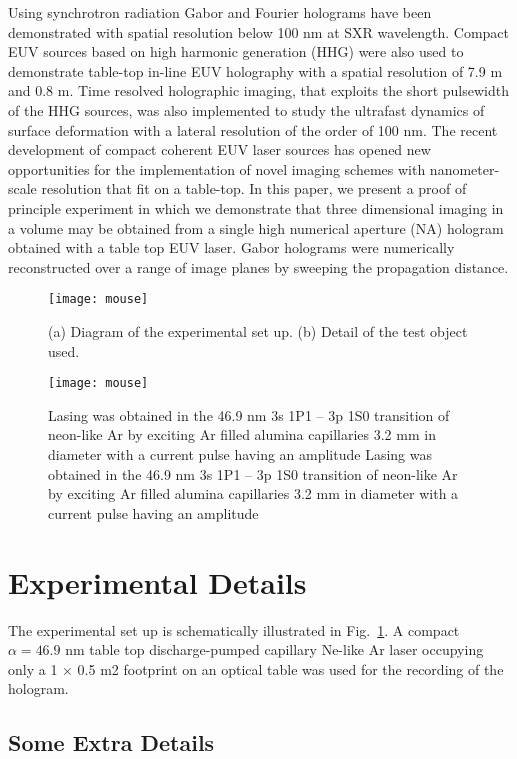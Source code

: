 \documentclass[]{IEEEphot}
\begin{document}
Using synchrotron radiation Gabor and Fourier holograms have been demonstrated with spatial resolution below 100 nm at SXR wavelength.  Compact EUV sources based on high harmonic generation (HHG) were also used to demonstrate table-top in-line EUV holography with a spatial resolution of 7.9 m and 0.8 m.  Time resolved holographic imaging, that exploits the short pulsewidth of the HHG sources, was also implemented to study the ultrafast dynamics of surface deformation with a lateral resolution of the order of 100 nm.  The recent development of compact coherent EUV laser sources has opened new opportunities for the implementation of novel imaging schemes with nanometer-scale resolution that fit on a table-top. In this paper, we present a proof of principle experiment in which we demonstrate that three dimensional imaging in a volume may be obtained from a single high numerical  aperture (NA) hologram obtained with a table top EUV laser. Gabor holograms were numerically reconstructed over a range of image planes by sweeping the propagation distance. 

\begin{figure}[t]
\centering
\texttt{[image: mouse]}
\caption{(a) Diagram of the experimental set up. (b) Detail of the test object used.}
\label{fig_env1}
\end{figure}

\begin{figure}[t]
\centering%
\texttt{[image: mouse]}
\caption{Lasing was obtained in the 46.9 nm 3s 1P1 – 3p 1S0  transition of neon-like Ar by exciting Ar filled alumina capillaries 3.2 mm in diameter with a current pulse having an amplitude Lasing was obtained in the 46.9 nm 3s 1P1 – 3p 1S0  transition of neon-like Ar by exciting Ar filled alumina capillaries 3.2 mm in diameter with a current pulse having an amplitude}
\label{fig_env2}\vspace*{-6pt}
\end{figure}

\section{Experimental Details}

 The experimental set up is schematically illustrated in Fig.~\ref{fig_env1}. A compact $\alpha=46.9$ nm table top discharge-pumped capillary Ne-like Ar laser occupying only a 1 × 0.5 m2 footprint on an optical table was used for the recording of the hologram.    


\subsection{Some Extra Details}
\end{document}
